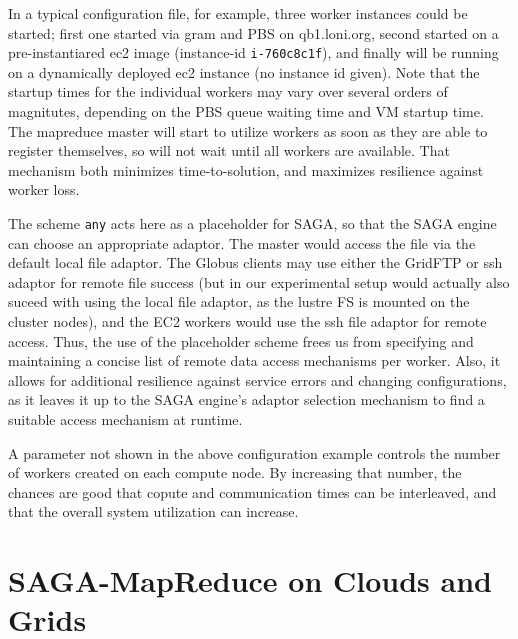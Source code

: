 \documentclass[conference,final]{IEEEtran}
\newcommand{\T}[1]{\texttt{#1}}
\begin{document}
  

In a typical configuration file, for example, three worker instances
could be started; first one started via gram and PBS on qb1.loni.org,
second started on a pre-instantiared ec2 image (instance-id
\T{i-760c8c1f}), and finally will be running on a dynamically deployed
ec2 instance (no instance id given).  Note that the startup times for
the individual workers may vary over several orders of magnitutes,
depending on the PBS queue waiting time and VM startup time.  The
mapreduce master will start to utilize workers as soon as they are
able to register themselves, so will not wait until all workers are
available.  That mechanism both minimizes time-to-solution, and
maximizes resilience against worker loss.

The scheme \T{any} acts here as a placeholder for SAGA, so that the
SAGA engine can choose an appropriate adaptor.  The master would
access the file via the default local file adaptor.  The Globus
clients may use either the GridFTP or ssh adaptor for remote file
success (but in our experimental setup would actually also suceed with
using the local file adaptor, as the lustre FS is mounted on the
cluster nodes), and the EC2 workers would use the ssh file adaptor for
remote access.  Thus, the use of the placeholder scheme frees us from
specifying and maintaining a concise list of remote data access
mechanisms per worker.  Also, it allows for additional resilience
against service errors and changing configurations, as it leaves it up
to the SAGA engine's adaptor selection mechanism to find a suitable
access mechanism at runtime.


A parameter not shown in the above configuration example controls the
number of workers created on each compute node.  By increasing that
number, the chances are good that copute and communication times can
be interleaved, and that the overall system utilization can increase.
 
\section{SAGA-MapReduce on Clouds and Grids}
\end{document}
